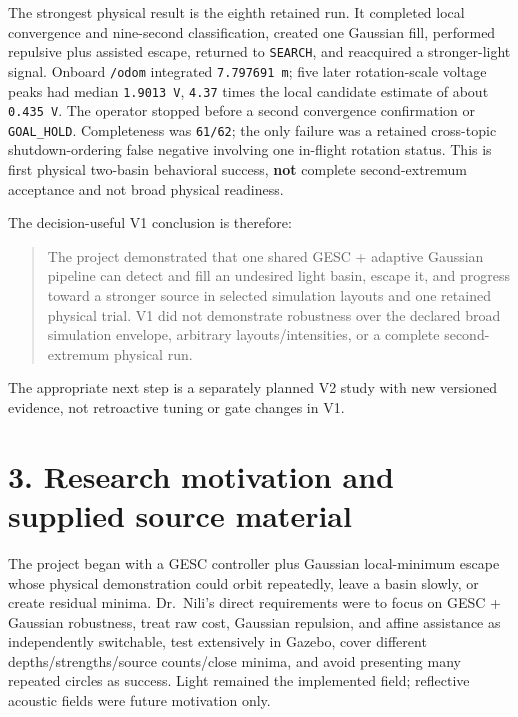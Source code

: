 \documentclass[
  10pt,
  letterpaper,
]{article}
\begin{document}
The strongest physical result is the eighth retained run. It completed local
convergence and nine-second classification, created one Gaussian fill,
performed repulsive plus assisted escape, returned to \nolinkurl{SEARCH}, and reacquired
a stronger-light signal. Onboard \nolinkurl{/odom} integrated \texttt{7.797691 m}; five later
rotation-scale voltage peaks had median \texttt{1.9013 V}, \nolinkurl{4.37} times the local
candidate estimate of about \texttt{0.435 V}. The operator stopped before a second
convergence confirmation or \nolinkurl{GOAL\_HOLD}. Completeness was \nolinkurl{61/62}; the only
failure was a retained cross-topic shutdown-ordering false negative involving
one in-flight rotation status. This is first physical two-basin behavioral
success, \textbf{not} complete second-extremum acceptance and not broad physical
readiness.

The decision-useful V1 conclusion is therefore:

\begin{quote}
The project demonstrated that one shared GESC + adaptive Gaussian pipeline
can detect and fill an undesired light basin, escape it, and progress toward
a stronger source in selected simulation layouts and one retained physical
trial. V1 did not demonstrate robustness over the declared broad simulation
envelope, arbitrary layouts/intensities, or a complete second-extremum
physical run.
\end{quote}

The appropriate next step is a separately planned V2 study with new versioned
evidence, not retroactive tuning or gate changes in V1.

\section{3. Research motivation and supplied source material}\label{research-motivation-and-supplied-source-material}

The project began with a GESC controller plus Gaussian local-minimum escape
whose physical demonstration could orbit repeatedly, leave a basin slowly, or
create residual minima. Dr.~Nili's direct requirements were to focus on GESC
+ Gaussian robustness, treat raw cost, Gaussian repulsion, and affine
assistance as independently switchable, test extensively in Gazebo, cover
different depths/strengths/source counts/close minima, and avoid presenting
many repeated circles as success. Light remained the implemented field;
reflective acoustic fields were future motivation only.
\end{document}
